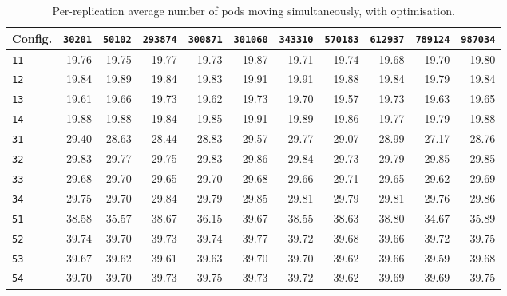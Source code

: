 \begin{table}[htb]
\centering
\small
\caption{Per-replication average number of pods moving simultaneously, with optimisation.}
\label{tab:app_pods_opt_true}
\begin{tabular}{@{}lrrrrrrrrrr@{}}
\toprule
\textbf{Config.} & \texttt{30201} & \texttt{50102} & \texttt{293874} & \texttt{300871} & \texttt{301060} & \texttt{343310} & \texttt{570183} & \texttt{612937} & \texttt{789124} & \texttt{987034} \\
\midrule
\texttt{11} & 19.76 & 19.75 & 19.77 & 19.73 & 19.87 & 19.71 & 19.74 & 19.68 & 19.70 & 19.80 \\
\texttt{12} & 19.84 & 19.89 & 19.84 & 19.83 & 19.91 & 19.91 & 19.88 & 19.84 & 19.79 & 19.84 \\
\texttt{13} & 19.61 & 19.66 & 19.73 & 19.62 & 19.73 & 19.70 & 19.57 & 19.73 & 19.63 & 19.65 \\
\texttt{14} & 19.88 & 19.88 & 19.84 & 19.85 & 19.91 & 19.89 & 19.86 & 19.77 & 19.79 & 19.88 \\
\texttt{31} & 29.40 & 28.63 & 28.44 & 28.83 & 29.57 & 29.77 & 29.07 & 28.99 & 27.17 & 28.76 \\
\texttt{32} & 29.83 & 29.77 & 29.75 & 29.83 & 29.86 & 29.84 & 29.73 & 29.79 & 29.85 & 29.85 \\
\texttt{33} & 29.68 & 29.70 & 29.65 & 29.70 & 29.68 & 29.66 & 29.71 & 29.65 & 29.62 & 29.69 \\
\texttt{34} & 29.75 & 29.70 & 29.84 & 29.79 & 29.85 & 29.81 & 29.79 & 29.81 & 29.76 & 29.86 \\
\texttt{51} & 38.58 & 35.57 & 38.67 & 36.15 & 39.67 & 38.55 & 38.63 & 38.80 & 34.67 & 35.89 \\
\texttt{52} & 39.74 & 39.70 & 39.73 & 39.74 & 39.77 & 39.72 & 39.68 & 39.66 & 39.72 & 39.75 \\
\texttt{53} & 39.67 & 39.62 & 39.61 & 39.63 & 39.70 & 39.70 & 39.62 & 39.66 & 39.59 & 39.68 \\
\texttt{54} & 39.70 & 39.70 & 39.73 & 39.75 & 39.73 & 39.72 & 39.62 & 39.69 & 39.69 & 39.75 \\
\bottomrule
\end{tabular}
\end{table}
